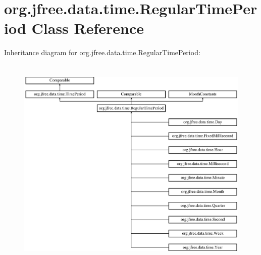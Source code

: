 \hypertarget{classorg_1_1jfree_1_1data_1_1time_1_1_regular_time_period}{}\section{org.\+jfree.\+data.\+time.\+Regular\+Time\+Period Class Reference}
\label{classorg_1_1jfree_1_1data_1_1time_1_1_regular_time_period}
Inheritance diagram for org.\+jfree.\+data.\+time.\+Regular\+Time\+Period\+:\begin{figure}[H]
\begin{center}
\leavevmode
\includegraphics[height=10.370370cm]{classorg_1_1jfree_1_1data_1_1time_1_1_regular_time_period}
\end{center}
\end{figure}
